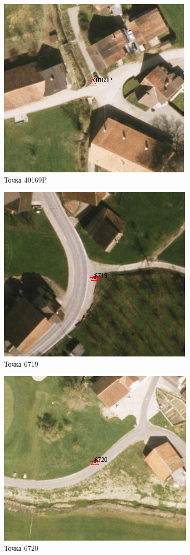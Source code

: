 \documentclass[
  12pt,
]{book}
\begin{document}
\begin{figure}
\centering
\includegraphics{images/Ref15/Point_40169P.png}
\caption{Точка 40169P}
\end{figure}

\begin{figure}
\centering
\includegraphics{images/Ref15/Point_6719.png}
\caption{Точка 6719}
\end{figure}

\begin{figure}
\centering
\includegraphics{images/Ref15/Point_6720.png}
\caption{Точка 6720}
\end{figure}
\end{document}
